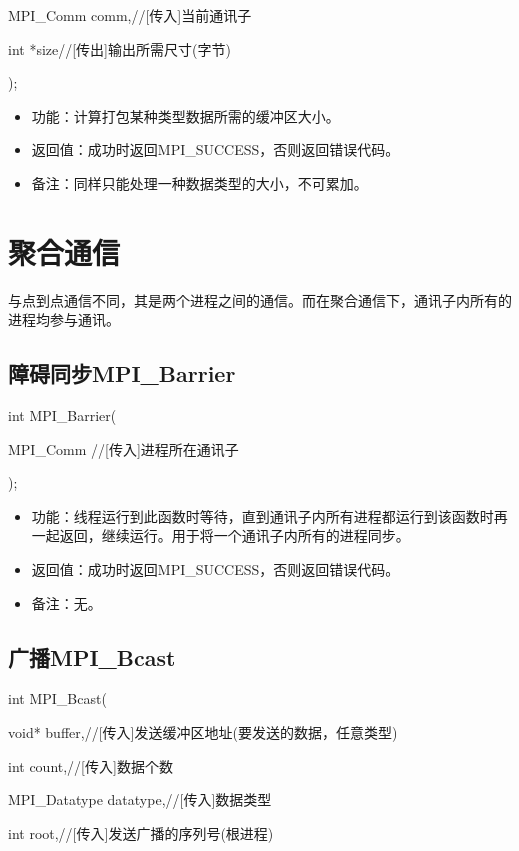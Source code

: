 \documentclass[UTF8]{article}%
\begin{document}
    \qquad MPI\_Comm     comm,//[传入]当前通讯子

    \qquad int           *size//[传出]输出所需尺寸(字节)

);

\begin{itemize}
    \item 功能：计算打包某种类型数据所需的缓冲区大小。
    \item 返回值：成功时返回MPI\_SUCCESS，否则返回错误代码。
    \item 备注：同样只能处理一种数据类型的大小，不可累加。
\end{itemize}

\section{聚合通信}

与点到点通信不同，其是两个进程之间的通信。而在聚合通信下，通讯子内所有的进程均参与通讯。

\subsection{障碍同步MPI\_Barrier}

int MPI\_Barrier(
    
    \qquad MPI\_Comm //[传入]进程所在通讯子
    
);

\begin{itemize}
    \item 功能：线程运行到此函数时等待，直到通讯子内所有进程都运行到该函数时再一起返回，继续运行。用于将一个通讯子内所有的进程同步。
    \item 返回值：成功时返回MPI\_SUCCESS，否则返回错误代码。
    \item 备注：无。
\end{itemize}

\subsection{广播MPI\_Bcast}

int MPI\_Bcast(

    \qquad void* buffer,//[传入]发送缓冲区地址(要发送的数据，任意类型)
    
    \qquad int count,//[传入]数据个数
    
    \qquad MPI\_Datatype datatype,//[传入]数据类型
    
    \qquad int root,//[传入]发送广播的序列号(根进程)
    
\end{document}
